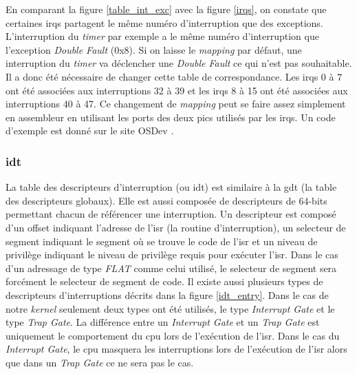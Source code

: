 En comparant la figure \ref{table_int_exc} avec la figure \ref{irqs}, on constate
que certaines \acrshort{irq}s partagent le même numéro d'interruption que des
exceptions. L'interruption du \textit{timer} par exemple a le même numéro d'interruption
que l'exception \textit{Double Fault} (0x8). Si on laisse le \textit{mapping} par
défaut, une interruption du \textit{timer} va déclencher une \textit{Double Fault}
ce qui n'est pas souhaitable. Il a donc été nécessaire de changer cette table
de correspondance. Les \acrshort{irq}s 0 à 7 ont été associées aux interruptions
32 à 39 et les \acrshort{irq}s 8 à 15 ont été associées aux interruptions 40 à 47.
Ce changement de \textit{mapping} peut se faire assez simplement en assembleur en
utilisant les ports des deux \acrshort{pic}s utilisés par les \acrshort{irq}s.
Un code d'exemple est donné sur le site OSDev \cite{ref22}.


\subsubsection{\acrshort{idt}}
\label{idt}
La table des descripteurs d'interruption (ou \acrshort{idt}) est similaire à la
\acrshort{gdt} (la table des descripteurs globaux). Elle est aussi composée de
descripteurs de 64-bits permettant chacun de référencer une interruption. Un
descripteur est composé d'un offset indiquant l'adresse de l'\acrshort{isr} (la
routine d'interruption), un selecteur de segment indiquant le segment où se trouve
le code de l'\acrshort{isr} et un niveau de privilège indiquant le niveau de privilège
requis pour exécuter l'\acrshort{isr}. Dans le cas d'un adressage de type \textit{FLAT}
comme celui utilisé, le selecteur de segment sera forcément le selecteur de segment
de code. Il existe aussi plusieurs types de descripteurs d'interruptions \cite{ref66}
décrits dans la figure \ref{idt_entry}. Dans le cas de notre \textit{kernel} seulement
deux types ont été utilisés, le type \textit{Interrupt Gate} et le type \textit{Trap Gate}.
La différence entre un \textit{Interrupt Gate} et un \textit{Trap Gate} est uniquement
le comportement du \acrshort{cpu} lors de l'exécution de l'\acrshort{isr}\cite{ref42}.
Dans le cas du \textit{Interrupt Gate}, le \acrshort{cpu} masquera les interruptions
lors de l'exécution de l'\acrshort{isr} alors que dans un \textit{Trap Gate} ce
ne sera pas le cas. \\

